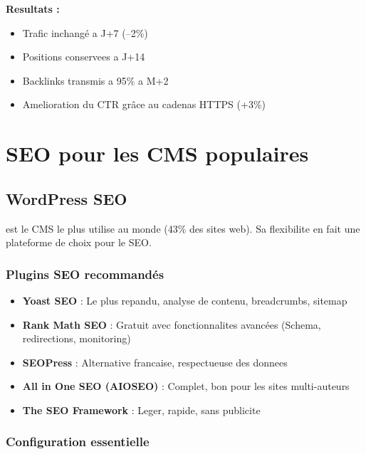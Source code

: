 \textbf{Resultats :}
\begin{itemize}
    \item Trafic inchangé a J+7 (--2\%)
    \item Positions conservees a J+14
    \item Backlinks transmis a 95\% a M+2
    \item Amelioration du CTR grâce au cadenas HTTPS (+3\%)
\end{itemize}



\chapter{SEO pour les CMS populaires}
\label{ch:cmsseo}

\section{WordPress SEO}

 est le CMS le plus utilise au monde (43\% des sites web). Sa flexibilite en fait une plateforme de choix pour le SEO.

\subsection{Plugins SEO recommandés}

\begin{itemize}
    \item \textbf{Yoast SEO} : Le plus repandu, analyse de contenu, breadcrumbs, sitemap
    \item \textbf{Rank Math SEO} : Gratuit avec fonctionnalites avancées (Schema, redirections, monitoring)
    \item \textbf{SEOPress} : Alternative francaise, respectueuse des donnees
    \item \textbf{All in One SEO (AIOSEO)} : Complet, bon pour les sites multi-auteurs
    \item \textbf{The SEO Framework} : Leger, rapide, sans publicite
\end{itemize}

\subsection{Configuration essentielle}

